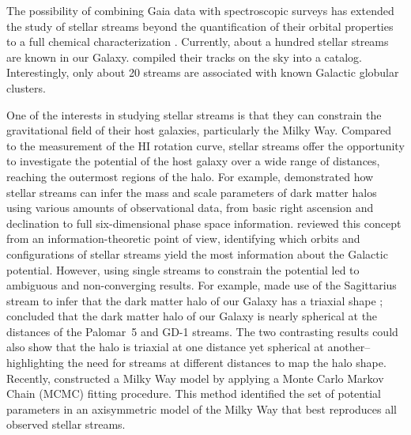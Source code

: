 \documentclass{aa}
\begin{document}
  The possibility of combining Gaia data with spectroscopic surveys has extended the study of stellar streams beyond the quantification of their orbital properties to a full chemical characterization \citep{2019MNRAS.490.3508L, 2020AJ....160..181J, 2021ApJ...911..149L, 2022ApJ...928...30L, 2024MNRAS.529.2413U}. Currently, about a hundred stellar streams are known in our Galaxy. \citet{2023MNRAS.520.5225M} compiled their tracks on the sky into a catalog. Interestingly, only about 20 streams are associated with known Galactic globular clusters.

  One of the interests in studying stellar streams is that they can constrain the gravitational field of their host galaxies, particularly the Milky Way. Compared to the measurement of the HI rotation curve, stellar streams offer the opportunity to investigate the potential of the host galaxy over a wide range of distances, reaching the outermost regions of the halo. For example, \citet{2011MNRAS.417..198V} demonstrated how stellar streams can infer the mass and scale parameters of dark matter halos using various amounts of observational data, from basic right ascension and declination to full six-dimensional phase space information. \citet{2018ApJ...867..101B} reviewed this concept from an information-theoretic point of view, identifying which orbits and configurations of stellar streams yield the most information about the Galactic potential. However, using single streams to constrain the potential led to ambiguous and non-converging results. For example, \citet{2010ApJ...718.1128L} made use of the Sagittarius stream to infer that the dark matter halo of our Galaxy has a triaxial shape \citep[but see also][]{2004MNRAS.351..643H, 2005ApJ...619..800J, 2005ApJ...619..807L}; \citet{2016ApJ...833...31B} concluded that the dark matter halo of our Galaxy is nearly spherical at the distances of the Palomar~5 and GD-1 streams. The two contrasting results could also show that the halo is triaxial at one distance yet spherical at another--highlighting the need for streams at different distances to map the halo shape. Recently, \citet{2024ApJ...967...89I} constructed a Milky Way model by applying a Monte Carlo Markov Chain (MCMC) fitting procedure. This method identified the set of potential parameters in an axisymmetric model of the Milky Way that best reproduces all observed stellar streams.
\end{document}
